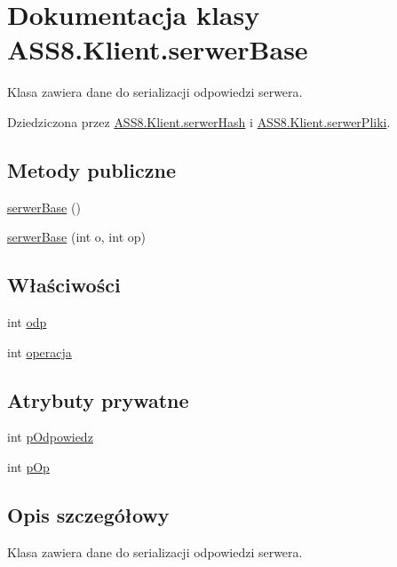 \hypertarget{a00023}{
\section{Dokumentacja klasy ASS8.Klient.serwerBase}
\label{d3/d52/a00023}
}
Klasa zawiera dane do serializacji odpowiedzi serwera.  


Dziedziczona przez \hyperlink{a00024}{ASS8.Klient.serwerHash} i \hyperlink{a00026}{ASS8.Klient.serwerPliki}.

\subsection*{Metody publiczne}
\begin{CompactItemize}
\item 
\hyperlink{a00023_03b6c0fe53e451d71bb621b6708ea20a}{serwerBase} ()
\item 
\hyperlink{a00023_0e5b05356082c0a469a2cd3ef53db565}{serwerBase} (int o, int op)
\end{CompactItemize}
\subsection*{Właściwości}
\begin{CompactItemize}
\item 
int \hyperlink{a00023_536a1e136873a8bc73f912bb72ee154a}{odp}
\item 
int \hyperlink{a00023_9e0414e76ae1f264010bd1dc1abbaef6}{operacja}
\end{CompactItemize}
\subsection*{Atrybuty prywatne}
\begin{CompactItemize}
\item 
int \hyperlink{a00023_78106818c3204874ec7767295f8c664d}{pOdpowiedz}
\item 
int \hyperlink{a00023_548856d9370b6b809f7218ee78af38b7}{pOp}
\end{CompactItemize}


\subsection{Opis szczegółowy}
Klasa zawiera dane do serializacji odpowiedzi serwera. 



